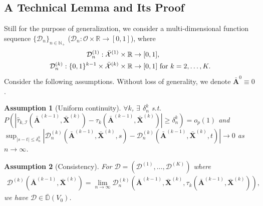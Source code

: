 \documentclass[11pt]{article}
\theoremstyle{referenceplain}
\newtheorem{assumption}{Assumption}
\theoremstyle{referencedefinition}
\theoremstyle{referenceremark}
\begin{document}
\subsection{A Technical Lemma and Its Proof}
Still for the purpose of generalization, we consider a multi-dimensional function sequence $\{\mathcal{D}_n\}_{n\in\mathbb{N}_+}$ ($\mathcal{D}_n:\mathcal{O}\times\mathbb{R}\to[0,1]$), where
\begin{align*}
    \mathcal{D}_n^{(1)}:\Bar{\mathcal{X}}^{(1)}\times \mathbb{R}&\to[0,1],\\
    \mathcal{D}_n^{(k)}:\{0,1\}^{k-1}\times\Bar{\mathcal{X}}^{(k)}\times\mathbb{R}&\to[0,1]\text{ for }k=2,\dots,K.
\end{align*}
Consider the following assumptions. Without loss of generality, we denote $\bar{\mathbf{A}}^{0}\equiv0$.
\begin{assumption}[Uniform continuity]\label{B10}
    $\forall k$,   $\exists$ $\delta_n^k$ s.t.  $P(|\widehat{\tau}_{k,\mathcal{I}}(\bar{\mathbf{A}}^{(k-1)},\bar{\mathbf{X}}^{(k)})-\tau_k(\bar{\mathbf{A}}^{(k-1)},\bar{\mathbf{X}}^{(k)})|\ge \delta_n^k)=o_p(1)$ and $\sup_{|s-t|\leq \delta_n^k}|\mathcal{D}_n^{(k)}(\bar{\mathbf{A}}^{(k-1)},\bar{\mathbf{X}}^{(k)},s)-\mathcal{D}_n^{(k)}(\bar{\mathbf{A}}^{(k-1)},\bar{\mathbf{X}}^{(k)},t)|\to 0$ as $n\to\infty$.
\end{assumption}
\begin{assumption}[Consistency]\label{B11}
    For $\mathcal{D}=(\mathcal{D}^{(1)},\dots,\mathcal{D}^{(K)})$ where
\begin{align*}
    \mathcal{D}^{(k)}(\bar{\mathbf{A}}^{(k-1)},\bar{\mathbf{X}}^{(k)})=\displaystyle{\lim_{n\to\infty}}\mathcal{D}_n^{(k)}(\bar{\mathbf{A}}^{(k-1)},\bar{\mathbf{X}}^{(k)},\tau_k(\bar{\mathbf{A}}^{(k-1)},\bar{\mathbf{X}}^{(k)})),
\end{align*}
we have $\mathcal{D}\in\bar{\mathbb{D}}(V_0)$.
\end{assumption}
\end{document}
